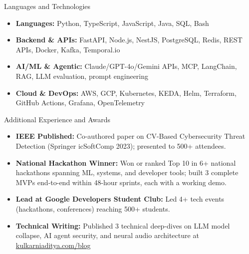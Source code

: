 \documentclass[]{mcdowellcv}
\begin{document}
\begin{cvsection}{Languages and Technologies}
  \begin{cvsubsection}{}{}{}
    \begin{itemize}
      \item \textbf{Languages:} Python, TypeScript, JavaScript, Java, SQL, Bash
      \item \textbf{Backend \& APIs:} FastAPI, Node.js, NestJS, PostgreSQL, Redis, REST APIs, Docker, Kafka, Temporal.io
      \item \textbf{AI/ML \& Agentic:} Claude/GPT-4o/Gemini APIs, MCP, LangChain, RAG, LLM evaluation, prompt engineering
      \item \textbf{Cloud \& DevOps:} AWS, GCP, Kubernetes, KEDA, Helm, Terraform, GitHub Actions, Grafana, OpenTelemetry
    \end{itemize}
  \end{cvsubsection}
\end{cvsection}

\begin{cvsection}{Additional Experience and Awards}
  \begin{cvsubsection}{}{}{}
    \begin{itemize}
      \item \textbf{IEEE Published:} Co-authored paper on CV-Based Cybersecurity Threat Detection (Springer icSoftComp 2023); presented to 500+ attendees.
      \item \textbf{National Hackathon Winner:} Won or ranked Top 10 in 6+ national hackathons spanning ML, systems, and developer tools; built 3 complete MVPs end-to-end within 48-hour sprints, each with a working demo.
      \item \textbf{Lead at Google Developers Student Club:} Led 4+ tech events (hackathons, conferences) reaching 500+ students.
      \item \textbf{Technical Writing:} Published 3 technical deep-dives on LLM model collapse, AI agent security, and neural audio architecture at \href{https://www.kulkarniaditya.com/blog}{kulkarniaditya.com/blog}
    \end{itemize}
  \end{cvsubsection}
\end{cvsection}
\end{document}
